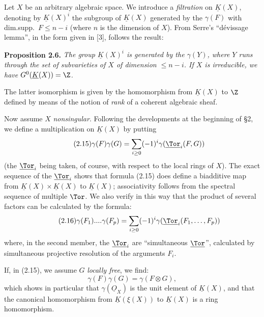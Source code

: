 Let $X$ be an arbitrary algebraic space. We introduce a \emph{filtration} on $\underline{K}(X)$, denoting by $\underline{K}(X)^i$ the subgroup of $\underline{K}(X)$ generated by the $\gamma(F)$ with dim.supp.\ $F\leq n-i$ (where $n$ is the dimension of $X$). From Serre's ``dévissage lemma'', in the form given in [3], follows the result:

\textbf{Proposition 2.6.} \emph{The group $\underline{K}(X)^i$ is generated by the $\gamma(Y)$, where $Y$ runs through the set of subvarieties of $X$ of dimension $\leq n-i$. If $X$ is irreducible, we have $G^0(\underline{K}(X))=\Z$.}

The latter isomorphism is given by the homomorphism from $\underline{K}(X)$ to $\Z$ defined by means of the notion of \emph{rank} of a coherent algebraic sheaf.

Now assume $X$ \emph{nonsingular}. Following the developments
%
at the beginning of \S 2, we
define a multiplication on $\underline{K}(X)$ by putting
\begin{equation}\tag{2.15}
 \gamma(F)\gamma(G)=\sum_{i\geq0}(-1)^i\gamma(\underline{\Tor}_i(F,G))
\end{equation}
(the $\underline{\Tor}_i$ being taken, of course, with respect to the local rings of $X$). The exact sequence of the $\underline{\Tor}_i$ shows that formula (2.15) does define a biadditive map from $\underline{K}(X)\times\underline{K}(X)$ to $\underline{K}(X)$; associativity follows from the spectral sequence of multiple $\Tor$. We also verify in this way that the product of several factors can be calculated by the formula:
\begin{equation}\tag{2.16}
 \gamma(F_1)....\gamma(F_p)=\sum_{i\geq0}(-1)^i\gamma(\underline{\Tor}_i(F_1,\ldots,F_p))
\end{equation}
where, in the second member, the $\underline{\Tor}_i$ are ``simultaneous $\underline{\Tor}$'', calculated by simultaneous projective resolution of the arguments $F_i$.

If, in (2.15), we assume $G$ \emph{locally free}, we find:
\begin{equation}\tag{2.15 bis}
 \gamma(F)\gamma(G)=\gamma(F\otimes G),
\end{equation}
which shows in particular that $\gamma(\underline{O}_X)$ is the unit element of $\underline{K}(X)$, and that the canonical homomorphism from $\underline{K}(\xi(X))$ to $\underline{K}(X)$ is a ring homomorphism.

